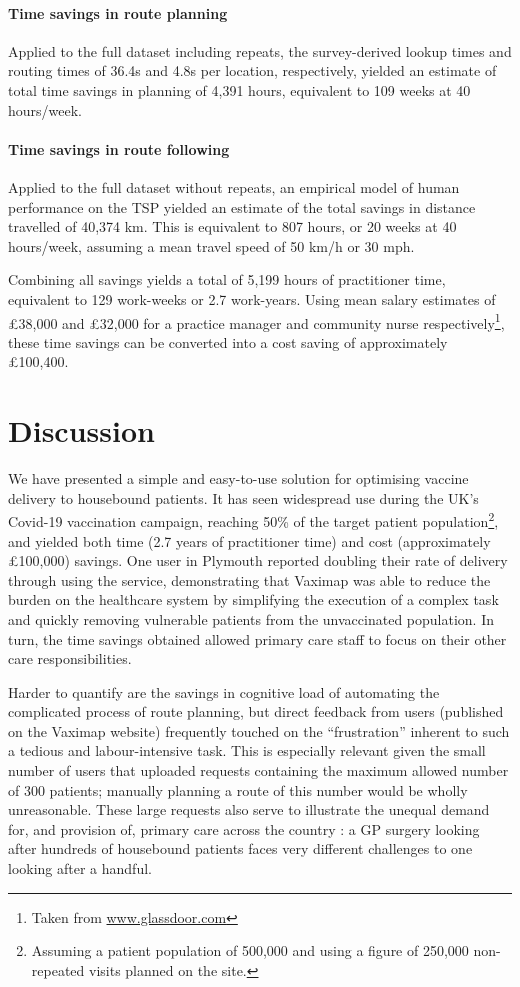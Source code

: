\documentclass{article}
\def\vm{Vaximap}
\begin{document}
\paragraph{Time savings in route planning}
Applied to the full dataset including repeats, the survey-derived lookup times and routing times of 36.4s and 4.8s per location, respectively, yielded an estimate of total time savings in planning of 4,391 hours, equivalent to 109 weeks at 40 hours/week. 

\paragraph{Time savings in route following}
Applied to the full dataset without repeats, an empirical model of human performance on the TSP yielded an estimate of the total savings in distance travelled of 40,374 km. This is equivalent to 807 hours, or 20 weeks at 40 hours/week, assuming a mean travel speed of 50 km/h or 30 mph.

Combining all savings yields a total of 5,199 hours of practitioner time, equivalent to 129 work-weeks or 2.7 work-years. Using mean salary estimates of £38,000 and £32,000 for a practice manager and community nurse respectively\footnote{Taken from \url{www.glassdoor.com}}, these time savings can be converted into a cost saving of approximately £100,400. 

\section{Discussion}

We have presented a simple and easy-to-use solution for optimising vaccine delivery to housebound patients. It has seen widespread use during the UK's Covid-19 vaccination campaign, reaching 50\% of the target patient population\footnote{Assuming a patient population of 500,000 and using a figure of 250,000 non-repeated visits planned on the site.}, and yielded both time (2.7 years of practitioner time) and cost (approximately £100,000) savings. One user in Plymouth reported doubling their rate of delivery through using the service, demonstrating that \vm{} was able to reduce the burden on the healthcare system by simplifying the execution of a complex task and quickly removing vulnerable patients from the unvaccinated population. In turn, the time savings obtained allowed primary care staff to focus on their other care responsibilities. 

Harder to quantify are the savings in cognitive load of automating the complicated process of route planning, but direct feedback from users (published on the \vm{} website) frequently touched on the ``frustration'' inherent to such a tedious and labour-intensive task. This is especially relevant given the small number of users that uploaded requests containing the maximum allowed number of 300 patients; manually planning a route of this number would be wholly unreasonable. These large requests also serve to illustrate the unequal demand for, and provision of, primary care across the country \cite{Rolewicz2021}: a GP surgery looking after hundreds of housebound patients faces very different challenges to one looking after a handful. 
\end{document}
